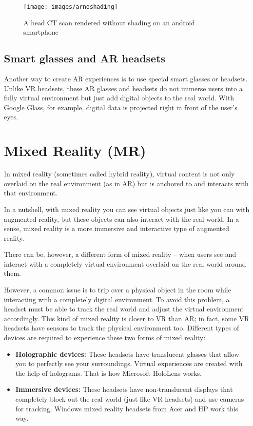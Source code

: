 \begin{figure}
\centering
\texttt{[image: images/arnoshading]}
\caption{A head CT scan rendered without shading on an android smartphone }
\label{fig:arnoshading}
\end{figure}

\subsection{Smart glasses and AR headsets}

Another way to create AR experiences is to use special smart glasses or headsets. Unlike VR headsets, these AR glasses and headsets do not immerse users into a fully virtual environment but just add digital objects to the real world. With Google Glass, for example, digital data is projected right in front of the user's eyes.

\section{ Mixed Reality (MR)}

In mixed reality (sometimes called hybrid reality), virtual content is not only overlaid on the real environment (as in AR) but is anchored to and interacts with that environment.

In a nutshell, with mixed reality you can see virtual objects just like you can with augmented reality, but these objects can also interact with the real world. In a sense, mixed reality is a more immersive and interactive type of augmented reality.

There can be, however, a different form of mixed reality – when users see and interact with a completely virtual environment overlaid on the real world around them.

However, a common issue is to trip over a physical object in the room while interacting with a completely digital environment.
To avoid this problem, a headset must be able to track the real world and adjust the virtual environment accordingly. This kind of mixed reality is closer to VR than AR; in fact, some VR headsets have sensors to track the physical environment too. Different types of devices are required to experience these two forms of mixed reality:

\begin{itemize}
 \item \textbf{ Holographic devices: } These headsets have translucent glasses that allow you to perfectly see your surroundings. Virtual experiences are created with the help of holograms. That is how Microsoft HoloLens works.
 
 \item \textbf{ Immersive devices:} These headsets have non-translucent displays that completely block out the real world (just like VR headsets) and use cameras for tracking. Windows mixed reality headsets from Acer and HP work this way.

\end{itemize}

